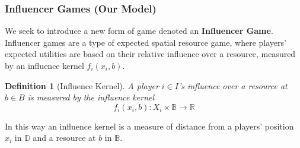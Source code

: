 \documentclass{article}
\newtheorem{definition}{Definition}
\begin{document}
            \subsubsection{Influencer Games (Our Model)}
                We seek to introduce a new form of game denoted an \textbf{Influencer Game}. Influencer games are a type of expected spatial resource game, where players' expected utilities are based on their relative influence over a resource, measured by an influence kernel $f_i(x_i,b)$. 
                \begin{definition}[Influence Kernel]
                    A player $i\in I$'s influence over a resource at $b\in B$ is measured by the influence kernel 
                    \begin{equation}\label{eq:SI_influence_kernel_def}
                        f_{i}(x_i,b):X_i\times \mathbb{B}\to\mathbb{R}
                    \end{equation}
                \end{definition}
                In this way an influence kernel is a measure of distance from a players' position $x_i$ in $\mathbb{D}$ and a resource at $b$ in $\mathbb{B}$.  
                
\end{document}
